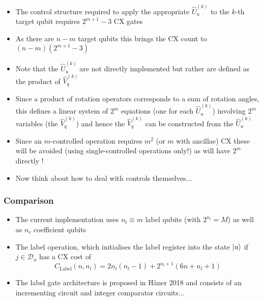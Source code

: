 \documentclass{beamer}
\begin{document}
\begin{frame}
\begin{itemize}
\item The control structure required to apply the appropriate $\hat{U}^{(k)}_u$ to the $k$-th target qubit requires $2^{m+1} -3$ CX gates 
\item As there are $n-m$ target qubits this brings the CX count to $(n-m) (2^{m+1}-3)$ 
\item Note that the $\hat{U}^{(k)}_u$ are not directly implemented but rather are defined as the product of $\hat{V}^{(k)}_q$
\item Since a product of rotation operators corresponds to a sum of rotation angles, this defines a linear system of $2^m$ equations (one for each $\hat{U}^{(k)}_u$) involving $2^m$ variables (the $\hat{V}^{(k)}_q$) and hence the $\hat{V}^{(k)}_q$ can be constructed from the $\hat{U}^{(k)}_u$   
\item Since an $m$-controlled operation requires $m^2$ (or $m$ with ancillae) CX these will be avoided (using single-controlled operations only!) as will have $2^m$ directly ! 
\item Now think about how to deal with controls themselves...
\end{itemize}
\end{frame}

\begin{frame}
\frametitle{Comparison}
\begin{itemize}
\item The current implementation uses $n_l \equiv m$ label qubits (with $2^{n_l} =M$) as well as $n_c$ coefficient qubits  
\item The label operation, which initialises the label register into the state $\ket{u}$ if $j \in \mathcal{D}_u$ has a CX cost of 
\begin{equation}
C_\text{Label}(n, n_l) = 2 n_l (n_l -1) + 2^{n_l +1 } (6 n + n_l +1) 
\end{equation}
\item The label gate architecture is proposed in H\"aner 2018 and consists of an incrementing circuit and integer comparator circuits...
\end{itemize}
\end{frame}
\end{document}
